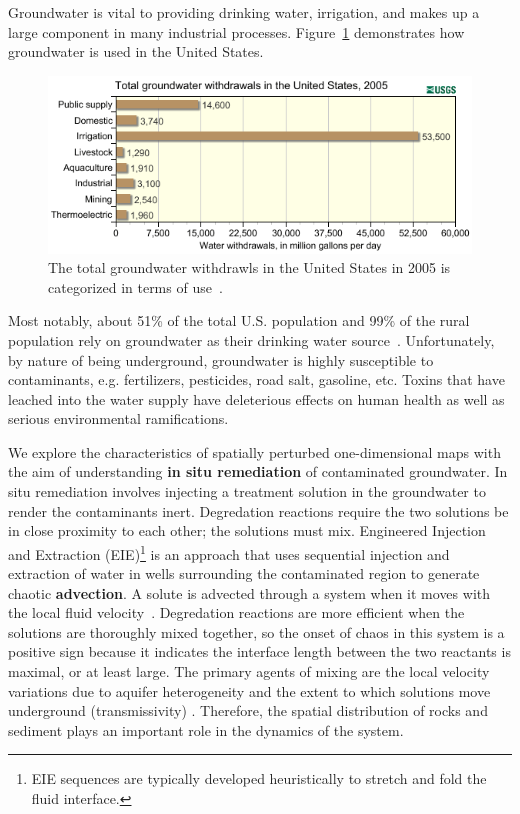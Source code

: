 Groundwater is vital
to providing drinking water, irrigation, and makes up a large
component in many industrial processes. Figure~\ref{fig:gwuse}
demonstrates how groundwater is used in the United States. 
\begin{figure}[!h]
\caption[Groundwater usage in the United States in 2005]{The total
  groundwater withdrawls in the United States in 2005 is categorized
  in terms of use~\cite{usgsgw}.}\label{fig:gwuse}
    \begin{center}
	\includegraphics[scale=0.8]{figs/gwuse.png}
    \end{center}
\end{figure}
Most
notably, about 51\% of the total U.S. population and 99\% of the
rural population rely on groundwater as their drinking water
source~\cite{gw}. Unfortunately, by nature of being underground,
groundwater is highly susceptible to contaminants, e.g. fertilizers,
pesticides, road salt, gasoline, etc. Toxins that have leached into
the water supply have deleterious effects on human health as well as
serious environmental ramifications. 

We explore the characteristics of spatially perturbed one-dimensional
maps with the aim of understanding \textbf{in situ remediation} of contaminated
groundwater. In situ remediation involves injecting a treatment
solution in the groundwater to render the contaminants
inert. Degredation reactions require the two solutions be in close proximity to each other; the solutions must mix. Engineered Injection and Extraction (EIE)\footnote{EIE sequences are typically developed
heuristically to stretch and fold the fluid interface.} is an
approach that uses sequential injection and extraction of water in wells surrounding
the contaminated region to generate chaotic \textbf{advection}. A
solute is advected through a system when it moves with the local fluid
velocity~\cite{advection}. Degredation reactions are more efficient when the solutions are thoroughly mixed
together, so the onset of chaos in this system is a positive sign
because it indicates the interface length between the two reactants is
maximal, or at least large. The primary agents of mixing are the local velocity
variations due to aquifer heterogeneity and the extent to which
solutions move underground (transmissivity)
\cite{neupauer}. Therefore, the spatial distribution of rocks and
sediment plays an important role in the dynamics of the system. 

